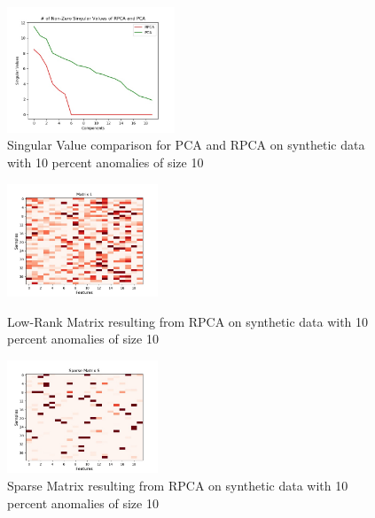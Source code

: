 \documentclass[conference]{IEEEtran}
\begin{document}
\begin{figure}[H]
    \centering
    \includegraphics[width=50mm, scale=0.5]{Singular_Value_Plot_Test_400AnomSize10.jpg}
    \caption{Singular Value comparison for PCA and RPCA on synthetic data with 10 percent anomalies of size 10}
    \label{fig:singvaltrain40010}
\end{figure}
\begin{figure}[H]
\begin{minipage}[b]{0.45\linewidth}
    \centering
    \includegraphics[width=45mm, scale=0.5]{L_400AnomSize10.jpg}
    \caption{Low-Rank Matrix resulting from RPCA on synthetic data with 10 percent anomalies of size 10}
    \label{fig:Ltrain40010}
\end{minipage}
\quad
\begin{minipage}[b]{0.45\linewidth}
    \includegraphics[width=45mm, scale=0.5]{S_400AnomSize10.jpg}
    \caption{Sparse Matrix resulting from RPCA on synthetic data with 10 percent anomalies of size 10}
    \label{fig:Strain40010}
\end{minipage}
\end{figure}
\end{document}
